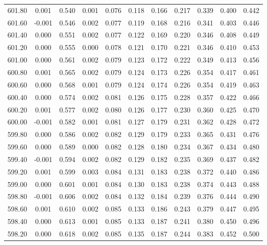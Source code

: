 \begin{longtable}{cccccccccc}
    601.80 &  0.001 &  0.540 &  0.001 &  0.076 &  0.118 &  0.166 &  0.217 &  0.339 &  0.400 &  0.442 \\
    601.60 & -0.001 &  0.546 &  0.002 &  0.077 &  0.119 &  0.168 &  0.216 &  0.341 &  0.403 &  0.446 \\
    601.40 &  0.000 &  0.551 &  0.002 &  0.077 &  0.122 &  0.169 &  0.220 &  0.346 &  0.408 &  0.449 \\
    601.20 &  0.000 &  0.555 &  0.000 &  0.078 &  0.121 &  0.170 &  0.221 &  0.346 &  0.410 &  0.453 \\
    601.00 &  0.000 &  0.561 &  0.002 &  0.079 &  0.123 &  0.172 &  0.222 &  0.349 &  0.413 &  0.456 \\
    600.80 &  0.001 &  0.565 &  0.002 &  0.079 &  0.124 &  0.173 &  0.226 &  0.354 &  0.417 &  0.461 \\
    600.60 &  0.000 &  0.568 &  0.001 &  0.079 &  0.124 &  0.174 &  0.226 &  0.354 &  0.419 &  0.463 \\
    600.40 &  0.000 &  0.574 &  0.002 &  0.081 &  0.126 &  0.175 &  0.228 &  0.357 &  0.422 &  0.466 \\
    600.20 &  0.001 &  0.577 &  0.002 &  0.080 &  0.126 &  0.177 &  0.230 &  0.360 &  0.425 &  0.470 \\
    600.00 & -0.001 &  0.582 &  0.001 &  0.081 &  0.127 &  0.179 &  0.231 &  0.362 &  0.428 &  0.472 \\
    599.80 &  0.000 &  0.586 &  0.002 &  0.082 &  0.129 &  0.179 &  0.233 &  0.365 &  0.431 &  0.476 \\
    599.60 &  0.000 &  0.589 &  0.000 &  0.082 &  0.128 &  0.180 &  0.234 &  0.367 &  0.434 &  0.480 \\
    599.40 & -0.001 &  0.594 &  0.002 &  0.082 &  0.129 &  0.182 &  0.235 &  0.369 &  0.437 &  0.482 \\
    599.20 &  0.001 &  0.599 &  0.003 &  0.084 &  0.131 &  0.183 &  0.238 &  0.372 &  0.440 &  0.486 \\
    599.00 &  0.000 &  0.601 &  0.001 &  0.084 &  0.130 &  0.183 &  0.238 &  0.374 &  0.443 &  0.488 \\
    598.80 & -0.001 &  0.606 &  0.002 &  0.084 &  0.132 &  0.184 &  0.239 &  0.376 &  0.444 &  0.490 \\
    598.60 &  0.001 &  0.610 &  0.002 &  0.085 &  0.133 &  0.186 &  0.243 &  0.379 &  0.447 &  0.495 \\
    598.40 &  0.000 &  0.613 &  0.001 &  0.085 &  0.133 &  0.187 &  0.241 &  0.380 &  0.450 &  0.496 \\
    598.20 &  0.000 &  0.618 &  0.002 &  0.085 &  0.135 &  0.187 &  0.244 &  0.383 &  0.452 &  0.500 \\

\end{longtable}
